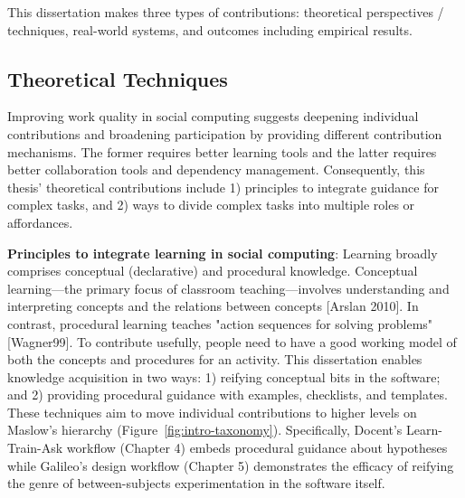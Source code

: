 This dissertation makes three types of contributions: theoretical perspectives / techniques, real-world systems, and outcomes including empirical results.

\subsection{Theoretical  Techniques}
Improving  work quality in social computing suggests deepening individual contributions and broadening participation by providing different contribution mechanisms. The former requires better learning tools and the latter requires better collaboration tools and dependency management. Consequently, this thesis' theoretical contributions include 1) principles to integrate guidance for complex tasks, and 2) ways to divide complex tasks into multiple roles or affordances.


\textbf{Principles to integrate learning in social computing}: Learning broadly comprises conceptual (declarative) and procedural knowledge. Conceptual learning---the primary focus of classroom teaching---involves understanding and interpreting concepts and the relations between concepts [Arslan 2010]. In contrast, procedural learning teaches "action sequences for solving problems" [Wagner99]. To contribute usefully, people need to have a good working model of both the concepts and procedures for an activity. This dissertation enables knowledge acquisition in two ways: 1) reifying conceptual bits in the software; and 2) providing procedural guidance with examples, checklists, and templates. These techniques aim to move individual contributions to higher levels on Maslow's hierarchy (Figure~\ref{fig:intro-taxonomy}). 
Specifically, Docent's Learn-Train-Ask workflow (Chapter 4) embeds procedural guidance about hypotheses while Galileo's design workflow (Chapter 5) demonstrates the efficacy of reifying the genre of between-subjects experimentation in the software itself.


